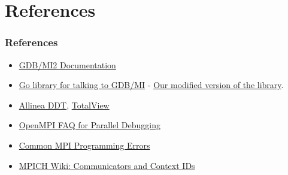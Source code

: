 \documentclass{beamer}
\begin{document}
\section{References}
\begin{frame}
  \frametitle{References}
  \begin{itemize}
  \item \href{https://sourceware.org/gdb/onlinedocs/gdb/GDB_002fMI.html}{GDB/MI2 Documentation}
  \item \href{https://github.com/cyrus-and/gdb}{Go library for talking to GDB/MI} - \href{https://github.com/milindl/gdb}{Our modified version of the library}.
  \item \href{https://en.wikipedia.org/wiki/Allinea_DDT}{Allinea DDT}, \href{https://www.roguewave.com/products-services/totalview}{TotalView}
  \item \href{https://www.open-mpi.org/faq/?category=debugging}{OpenMPI FAQ for Parallel Debugging}
  \item \href{http://www.linux-mag.com/id/7210/}{Common MPI Programming Errors}
  \item \href{https://wiki.mpich.org/mpich/index.php/Communicators_and_Context_IDs}{MPICH Wiki: Communicators and Context IDs}
  \end{itemize}
\end{frame}
\end{document}
